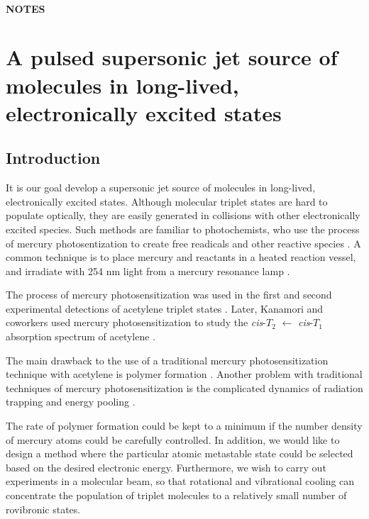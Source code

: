 \documentclass[12pt]{mitthesis}
\begin{document}
\tableofcontents
\clearpage

\subsubsection*{NOTES}
\clearpage

\chapter{A pulsed supersonic jet source of molecules in long-lived,
  electronically excited states
}

\section{Introduction}


It is our goal develop a supersonic jet source of molecules in
long-lived, electronically excited states.  Although molecular triplet
states are hard to populate optically, they are easily generated in
collisions with other electronically excited species.  Such methods
are familiar to photochemists, who use the process of mercury
photosentization to create free readicals and other reactive species
\cite{brown89, brown88, crabtree92, cvetanovic64, phillips74,
  strausz70}.  A common technique is to place mercury and reactants in
a heated reaction vessel, and irradiate with 254 nm light from a
mercury resonance lamp \cite{brown87}.

The process of mercury photosensitization was used in the first and
second experimental detections of acetylene triplet states
\cite{burton72, wendt79}.  Later, Kanamori and coworkers used mercury
photosensitization to study the \emph{cis}-$T_2$ $\leftarrow$
\emph{cis}-$T_1$ absorption spectrum of acetylene \cite{kanamori07}.

The main drawback to the use of a traditional mercury
photosensitization technique with acetylene is polymer formation
\cite{shida58, leroy44}.  Another problem with traditional techniques
of mercury photosensitization is the complicated dynamics of radiation
trapping and energy pooling \cite{menningen00, herd05, majetich89,
  majetich91}.

The rate of polymer formation could be kept to a minimum if the number
density of mercury atoms could be carefully controlled.  In addition,
we would like to design a method where the particular atomic
metastable state could be selected based on the desired electronic
energy.  Furthermore, we wish to carry out experiments in a molecular
beam, so that rotational and vibrational cooling can concentrate the
population of triplet molecules to a relatively small number of
rovibronic states.
\end{document}
